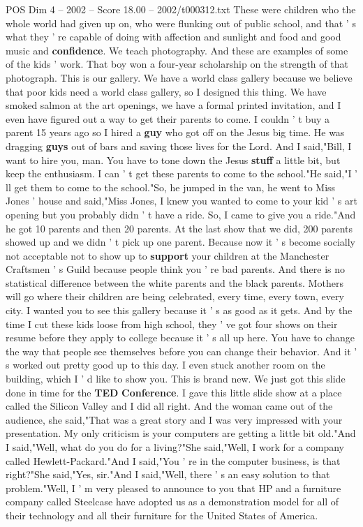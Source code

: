 \begin{textsample}{POS Dim 4 – 2002 – Score 18.00 – 2002/t000312.txt}
These were children who the whole world had given up on, who were flunking out of public school, and that ' s what they ' re capable of doing with affection and sunlight and food and good music and \textbf{confidence}.
We teach photography.
And these are examples of some of the kids ' work.
That boy won a four-year scholarship on the strength of that photograph.
This is our gallery.
We have a world class gallery because we believe that poor kids need a world class gallery, so I designed this thing.
We have smoked salmon at the art openings, we have a formal printed invitation, and I even have figured out a way to get their parents to come.
I couldn ' t buy a parent 15 years ago so I hired a \textbf{guy} who got off on the Jesus big time.
He was dragging \textbf{guys} out of bars and saving those lives for the Lord.
And I said,"Bill, I want to hire you, man.
You have to tone down the Jesus \textbf{stuff} a little bit, but keep the enthusiasm.
I can ' t get these parents to come to the school."He said,"I ' ll get them to come to the school."So, he jumped in the van, he went to Miss Jones ' house and said,"Miss Jones, I knew you wanted to come to your kid ' s art opening but you probably didn ' t have a ride.
So, I came to give you a ride."And he got 10 parents and then 20 parents.
At the last show that we did, 200 parents showed up and we didn ' t pick up one parent.
Because now it ' s become socially not acceptable not to show up to \textbf{support} your children at the Manchester Craftsmen ' s Guild because people think you ' re bad parents.
And there is no statistical difference between the white parents and the black parents.
Mothers will go where their children are being celebrated, every time, every town, every city.
I wanted you to see this gallery because it ' s as good as it gets.
And by the time I cut these kids loose from high school, they ' ve got four shows on their resume before they apply to college because it ' s all up here.
You have to change the way that people see themselves before you can change their behavior.
And it ' s worked out pretty good up to this day.
I even stuck another room on the building, which I ' d like to show you.
This is brand new.
We just got this slide done in time for the \textbf{TED} \textbf{Conference}.
I gave this little slide show at a place called the Silicon Valley and I did all right.
And the woman came out of the audience, she said,"That was a great story and I was very impressed with your presentation.
My only criticism is your computers are getting a little bit old."And I said,"Well, what do you do for a living?"She said,"Well, I work for a company called Hewlett-Packard."And I said,"You ' re in the computer business, is that right?"She said,"Yes, sir."And I said,"Well, there ' s an easy solution to that problem."Well, I ' m very pleased to announce to you that HP and a furniture company called Steelcase have adopted us as a demonstration model for all of their technology and all their furniture for the United States of America.

\end{textsample}
